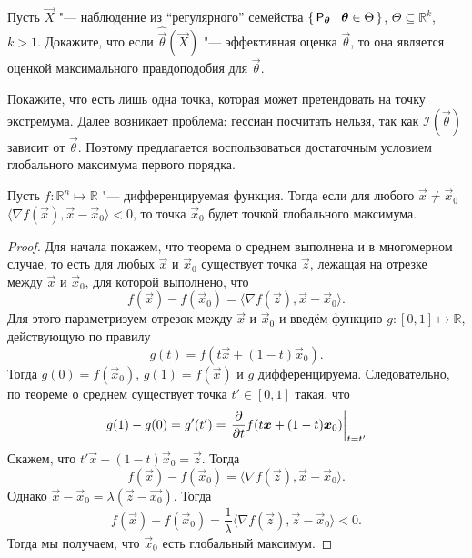 \begin{problem}
    Пусть $\vec{X}$ "--- наблюдение из ``регулярного'' семейства $\set{\mathsf{P}_{\bm{\theta}} \mid \bm{\theta} \in \Theta}$, $\Theta \subseteq \mathbb{R}^{k}$, $k > 1$. Докажите, что если $\hat{\vec{\theta}}(\vec{X})$ "--- эффективная оценка $\vec{\theta}$, то она является оценкой максимального правдоподобия для $\vec{\theta}$.
\end{problem}
\begin{hint}
    Покажите, что есть лишь одна точка, которая может претендовать на точку экстремума. Далее возникает проблема: гессиан посчитать нельзя, так как $\mathcal{I}(\vec{\theta})$ зависит от $\vec{\theta}$. Поэтому предлагается воспользоваться достаточным условием глобального максимума первого порядка.
\end{hint}
\begin{theorem}
    Пусть $f \colon \mathbb{R}^{n} \mapsto \mathbb{R}$ "--- дифференцируемая функция. Тогда если для любого $\vec{x} \neq \vec{x}_{0}$ $\langle \nabla f(\vec{x}), \vec{x} - \vec{x}_{0} \rangle < 0$, то точка $\vec{x}_{0}$ будет точкой глобального максимума.
\end{theorem}
\begin{proof}
    Для начала покажем, что теорема о среднем выполнена и в многомерном случае, то есть для любых $\vec{x}$ и $\vec{x}_{0}$ существует точка $\vec{z}$, лежащая на отрезке между $\vec{x}$ и $\vec{x}_{0}$, для которой выполнено, что
    \[
        f(\vec{x}) - f(\vec{x}_{0}) = \langle \nabla f(\vec{z}), \vec{x} - \vec{x}_{0} \rangle.
    \]
    Для этого параметризуем отрезок между $\vec{x}$ и $\vec{x}_{0}$ и введём функцию $g \colon [0, 1] \mapsto \mathbb{R}$, действующую по правилу
    \[
        g(t) = f(t\vec{x} + (1 - t)\vec{x}_{0}).
    \]
    Тогда $g(0) = f(\vec{x}_{0})$, $g(1) = f(\vec{x})$ и $g$ дифференцируема. Следовательно, по теореме о среднем существует точка $t' \in [0, 1]$ такая, что
    \[
        g(1) - g(0) = g'(t') = \left.\pdv{t} f(t\bm{x} + (1 - t)\bm{x}_{0})\right|_{t = t'}
    \]
    Скажем, что $t'\vec{x} + (1 - t)\vec{x}_{0} = \vec{z}$. Тогда
    \[
        f(\vec{x}) - f(\vec{x}_{0}) = \langle \nabla f(\vec{z}), \vec{x} - \vec{x}_{0} \rangle.
    \]
    Однако $\vec{x} - \vec{x}_{0} = \lambda(\vec{z} - \vec{x_{0}})$. Тогда
    \[
        f(\vec{x}) - f(\vec{x}_{0}) = \frac{1}{\lambda}\langle \nabla f(\vec{z}), \vec{z} - \vec{x}_{0} \rangle < 0.
    \]
    Тогда мы получаем, что $\vec{x}_{0}$ есть глобальный максимум.
\end{proof}

